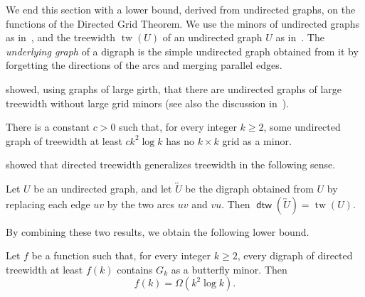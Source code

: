 \documentclass[fontsize=12pt,leading=14pt]{fullpaper}
\DeclareMathOperator{\dtw}{\mathsf{dtw}}
\begin{document}
We end this section with a lower bound, derived from undirected graphs, on the functions of the Directed Grid Theorem.
We use the minors of undirected graphs as in~\cite[Section~1.7]{Diestel17}, and the treewidth $\operatorname{tw}(U)$ of an undirected graph $U$ as in~\cite[Chapter~12]{Diestel17}.
The \emph{underlying graph} of a digraph is the simple undirected graph obtained from it by forgetting the directions of the arcs and merging parallel edges.

\textcite{RST94} showed, using graphs of large girth, that there are undirected graphs of large treewidth without large grid minors (see also the discussion in~\cite[Section~1]{CC16}).

\begin{proposition}\label{prop:rst-lower}
  There is a constant $c>0$ such that, for every integer $k\ge2$, some undirected graph of treewidth at least $ck^2\log k$ has no $k\times k$ grid as a minor.
\end{proposition}

\textcite{Johnson2001} showed that directed treewidth generalizes treewidth in the following sense.

\begin{proposition}\label{prop:dtw-bidirected}
  Let $U$ be an undirected graph, and let $\overleftrightarrow U$ be the digraph obtained from $U$ by replacing each edge $uv$ by the two arcs $uv$ and $vu$.
  Then $\dtw(\overleftrightarrow U)=\operatorname{tw}(U)$.
\end{proposition}

By combining these two results, we obtain the following lower bound.

\begin{corollary}\label{prop:grid-lower-bound}
  Let $f$ be a function such that, for every integer $k\ge2$, every digraph of directed treewidth at least $f(k)$ contains $G_k$ as a butterfly minor.
  Then
  \[
    f(k)=\Omega(k^2\log k).
  \]
\end{corollary}
\end{document}
